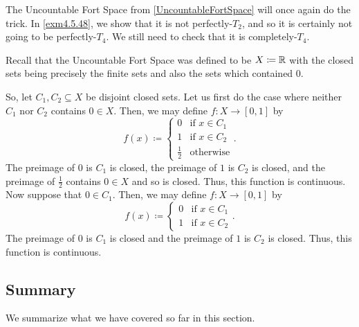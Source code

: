 \begin{exm}
The Uncountable Fort Space from \cref{UncountableFortSpace} will once again do the trick.  In \cref{exm4.5.48}, we show that it is not perfectly-$T_2$, and so it is certainly not going to be perfectly-$T_4$.  We still need to check that it is completely-$T_4$.

Recall that the Uncountable Fort Space was defined to be $X\coloneqq \mathbb{R}$ with the closed sets being precisely the finite sets and also the sets which contained $0$.

So, let $C_1,C_2\subseteq X$ be disjoint closed sets.  Let us first do the case where neither $C_1$ nor $C_2$ contains $0\in X$.  Then, we may define $f:X\rightarrow [0,1]$ by
\begin{equation}
f(x)\coloneqq \begin{cases}0 & \text{if }x\in C_1 \\ 1 & \text{if }x\in C_2 \\ \tfrac{1}{2} & \text{otherwise}\end{cases}.
\end{equation}
The preimage of $0$ is $C_1$ is closed, the preimage of $1$ is $C_2$ is closed, and the preimage of $\frac{1}{2}$ contains $0\in X$ and so is closed.  Thus, this function is continuous.  Now suppose that $0\in C_1$.  Then, we may define $f:X\rightarrow [0,1]$ by
\begin{equation}
f(x)\coloneqq \begin{cases}0 & \text{if }x\in C_1 \\ 1 & \text{if }x\in C_2\end{cases}.
\end{equation}
The preimage of $0$ is $C_1$ is closed and the preimage of $1$ is $C_2$ is closed.  Thus, this function is continuous.
\end{exm}

\subsection{Summary}

We summarize what we have covered so far in this section.

